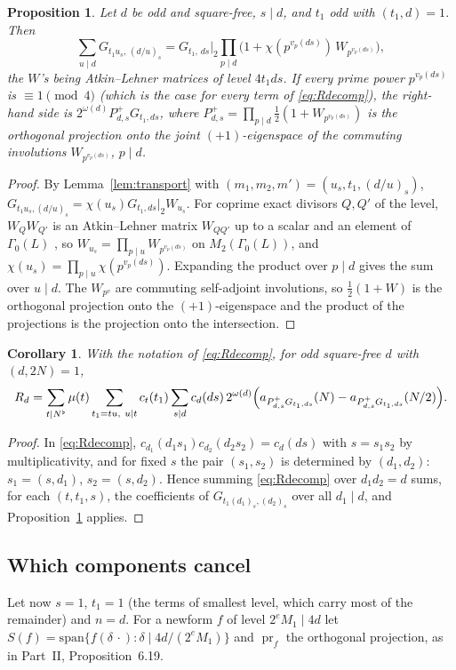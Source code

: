 \documentclass[11pt]{amsart}
\newtheorem{proposition}[theorem]{Proposition}
\newtheorem{corollary}[theorem]{Corollary}
\theoremstyle{remark}
\DeclareMathOperator{\pr}{pr}
\begin{document}
\begin{proposition}\label{prop:sym}
Let $d$ be odd and square-free, $s\mid d$, and $t_1$ odd with $(t_1,d)=1$. Then
\[
\sum_{u\mid d}G_{t_1u_s,\,(d/u)_s}=G_{t_1,\,ds}\Big|_2\prod_{p\mid d}\bigl(1+\chi(p^{v_p(ds)})\,W_{p^{v_p(ds)}}\bigr),
\]
the $W$'s being Atkin--Lehner matrices of level $4t_1ds$. If every prime power $p^{v_p(ds)}$ is $\equiv1\pmod4$ (which is the case for every term of \eqref{eq:Rdecomp}), the right-hand side is $2^{\omega(d)}P^+_{d,s}G_{t_1,ds}$, where $P^+_{d,s}=\prod_{p\mid d}\frac12(1+W_{p^{v_p(ds)}})$ is the orthogonal projection onto the joint $(+1)$-eigenspace of the commuting involutions $W_{p^{v_p(ds)}}$, $p\mid d$.
\end{proposition}
\begin{proof}
By Lemma~\ref{lem:transport} with $(m_1,m_2,m')=(u_s,t_1,(d/u)_s)$, $G_{t_1u_s,(d/u)_s}=\chi(u_s)G_{t_1,ds}|_2W_{u_s}$. For coprime exact divisors $Q,Q'$ of the level, $W_QW_{Q'}$ is an Atkin--Lehner matrix $W_{QQ'}$ up to a scalar and an element of $\Gamma_0(L)$ \cite{AL}, so $W_{u_s}=\prod_{p\mid u}W_{p^{v_p(ds)}}$ on $M_2(\Gamma_0(L))$, and $\chi(u_s)=\prod_{p\mid u}\chi(p^{v_p(ds)})$. Expanding the product over $p\mid d$ gives the sum over $u\mid d$. The $W_{p^{v}}$ are commuting self-adjoint involutions, so $\frac12(1+W)$ is the orthogonal projection onto the $(+1)$-eigenspace and the product of the projections is the projection onto the intersection.
\end{proof}

\begin{corollary}\label{cor:Rd}
With the notation of \eqref{eq:Rdecomp}, for odd square-free $d$ with $(d,2N)=1$,
\[
R_d=\sum_{t\mid N^\flat}\mu(t)\sum_{t_1=tu,\ u\mid t}c_t(t_1)\sum_{s\mid d}c_d(ds)\,2^{\omega(d)}\Bigl(a_{P^+_{d,s}G_{t_1,ds}}(N)-a_{P^+_{d,s}G_{t_1,ds}}(N/2)\Bigr).
\]
\end{corollary}
\begin{proof}
In \eqref{eq:Rdecomp}, $c_{d_1}(d_1s_1)c_{d_2}(d_2s_2)=c_d(ds)$ with $s=s_1s_2$ by multiplicativity, and for fixed $s$ the pair $(s_1,s_2)$ is determined by $(d_1,d_2)$: $s_1=(s,d_1)$, $s_2=(s,d_2)$. Hence summing \eqref{eq:Rdecomp} over $d_1d_2=d$ sums, for each $(t,t_1,s)$, the coefficients of $G_{t_1(d_1)_s,(d_2)_s}$ over all $d_1\mid d$, and Proposition~\ref{prop:sym} applies.
\end{proof}

\subsection{Which components cancel}
Let now $s=1$, $t_1=1$ (the terms of smallest level, which carry most of the remainder) and $n=d$. For a newform $f$ of level $2^eM_1\mid4d$ let $S(f)=\mathrm{span}\{f(\delta\,\cdot):\delta\mid4d/(2^eM_1)\}$ and $\pr_f$ the orthogonal projection, as in Part~II, Proposition~6.19.
\end{document}
